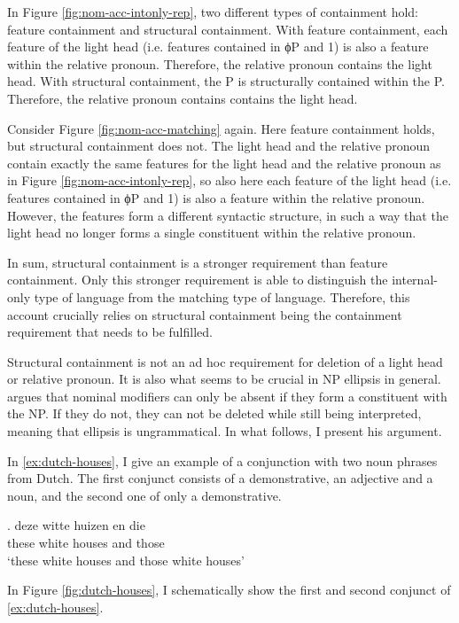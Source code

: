 In Figure \ref{fig:nom-acc-intonly-rep}, two different types of containment hold: feature containment and structural containment.
With feature containment, each feature of the light head (i.e. features contained in ϕP and 1) is also a feature within the relative pronoun. Therefore, the relative pronoun contains the light head.
With structural containment, the P is structurally contained within the P. Therefore, the relative pronoun contains contains the light head.

Consider Figure \ref{fig:nom-acc-matching} again. Here feature containment holds, but structural containment does not.
The light head and the relative pronoun contain exactly the same features for the light head and the relative pronoun as in Figure \ref{fig:nom-acc-intonly-rep}, so also here each feature of the light head (i.e. features contained in ϕP and 1) is also a feature within the relative pronoun.
However, the features form a different syntactic structure, in such a way that the light head no longer forms a single constituent within the relative pronoun.

In sum, structural containment is a stronger requirement than feature containment. Only this stronger requirement is able to distinguish the internal-only type of language from the matching type of language. Therefore, this account crucially relies on structural containment being the containment requirement that needs to be fulfilled.

Structural containment is not an ad hoc requirement for deletion of a light head or relative pronoun. It is also what seems to be crucial in NP ellipsis in general. \citet{cinqueforthcoming} argues that nominal modifiers can only be absent if they form a constituent with the NP. If they do not, they can not be deleted while still being interpreted, meaning that ellipsis is ungrammatical. In what follows, I present his argument.

In \ref{ex:dutch-houses}, I give an example of a conjunction with two noun phrases from Dutch. The first conjunct consists of a demonstrative, an adjective and a noun, and the second one of only a demonstrative.

\exg. deze witte huizen en die\\
 these white houses and those\\
 `these white houses and those white houses' \label{ex:dutch-houses}

In Figure \ref{fig:dutch-houses}, I schematically show the first and second conjunct of \ref{ex:dutch-houses}.


